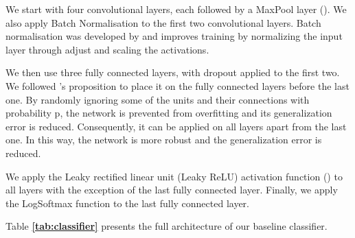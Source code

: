 \documentclass{l4proj}
\begin{document}
We start with four convolutional layers, each followed by a MaxPool layer (\cite{maxpool}). 
We also apply Batch Normalisation to the first two convolutional layers. Batch normalisation was developed by \cite{batchnorm} and improves training by normalizing the input layer through adjust and scaling the activations.

We then use three fully connected layers, with dropout applied to the first two. We followed \cite{dropout}'s proposition to place it on the fully connected layers before the last one. By randomly ignoring some of the units and their connections with probability p, the network is prevented from overfitting and its generalization error is reduced. Consequently, it can be applied on all layers apart from the last one. In this way, the network is more robust and the generalization error is reduced.

We apply the Leaky rectified linear unit (Leaky ReLU) activation function (\cite{activations}) to all layers with the exception of the last fully connected layer.
Finally, we apply the LogSoftmax function to the last fully connected layer.

Table \textbf{\ref{tab:classifier}} presents the full architecture of our baseline classifier.
\end{document}
